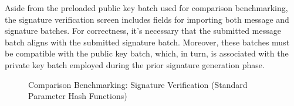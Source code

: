 \documentclass[]{final_report}
\theoremstyle{definition}
\begin{document}
Aside from the preloaded public key batch used for comparison benchmarking, the signature verification screen includes fields for importing both message and signature batches. For correctness, it's necessary that the submitted message batch aligns with the submitted signature batch. Moreover, these batches must be compatible with the public key batch, which, in turn, is associated with the private key batch employed during the prior signature generation phase.


\begin{figure}[H]
    \centering %
    
    \begin{minipage}{0.49\textwidth}
        \centering
        \caption{Comparison Benchmarking: Signature Verification (Standard Parameter Hash Functions)}
        \label{fig:image1}
    \end{minipage}
    \hfill %
    \begin{minipage}{0.49\textwidth}
        \centering

\end{minipage}
\end{figure}
\end{document}
